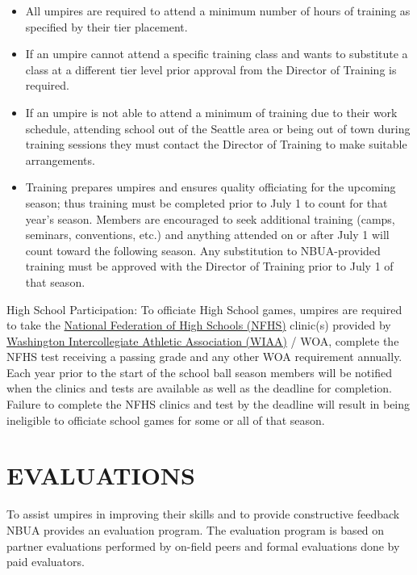 \documentclass[letterpaper,11pt,colorlinks=true,allcolors=blue]{article}
\begin{document}
\begin{itemize}
\item All umpires are required to attend a minimum number of hours of training as specified by their tier placement.
\item If an umpire cannot attend a specific training class and wants to substitute a class at a different tier level prior approval from the Director of Training is required.
\item If an umpire is not able to attend a minimum of training due to their work schedule, attending school out of the Seattle area or being out of town during training sessions they must contact the Director of Training to make suitable arrangements.
\item Training prepares umpires and ensures quality officiating for the upcoming season; thus training must be completed prior to July 1 to count for that year's season.  Members are encouraged to seek additional training (camps, seminars, conventions, etc.)  and anything attended on or after July 1 will count toward the following season. Any substitution to NBUA-provided training must be approved with the Director of Training prior to July 1 of that season.
\end{itemize}

High School Participation: To officiate High School games, umpires are required to take the \href{http://www.nfhs.org/}{National Federation of High Schools (NFHS)} clinic(s) provided by \href{http://wiaa.com/}{Washington Intercollegiate Athletic Association (WIAA)} / WOA, complete the NFHS test receiving a passing grade and any other WOA requirement annually. Each year prior to the start of the school ball season members will be notified when the clinics and tests are available as well as the deadline for completion. Failure to complete the NFHS clinics and test by the deadline will result in being ineligible to officiate school games for some or all of that season.

\newpage
\section{EVALUATIONS}
To assist umpires in improving their skills and to provide constructive feedback NBUA provides an evaluation program. The evaluation program is based on partner evaluations performed by on-field peers and formal evaluations done by paid evaluators.
\end{document}
